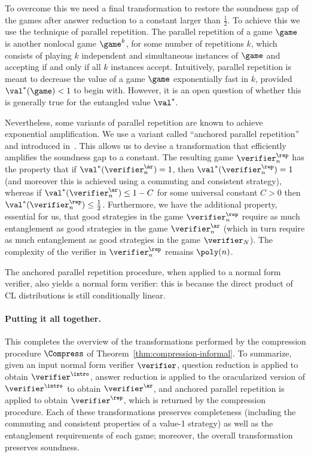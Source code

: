 To overcome this we need a final transformation to restore the soundness gap of the games after answer reduction to a constant larger than $\frac{1}{2}$. To achieve this we use the technique of {parallel repetition}. The parallel repetition of a game $\game$ is another nonlocal game $\game^k$, for some number of repetitions $k$, which consists of playing $k$ independent and simultaneous instances of $\game$ and accepting if and only if all $k$ instances accept. Intuitively, parallel repetition is meant to decrease the value of a game $\game$ exponentially fast in $k$, provided $\val^*(\game) < 1$ to begin with. However, it is an open question of whether this is generally true for the entangled value $\val^*$. 

Nevertheless, some variants of parallel repetition are known to achieve exponential amplification. We use  a variant  called ``anchored parallel repetition'' and introduced in~\cite{bavarian2017hardness}. This allows us to devise a transformation that efficiently amplifies the soundness gap to a constant. The resulting game $\verifier^\rep_n$ has the property that if $\val^*(\verifier^\ar_n) = 1$, then $\val^*(\verifier^\rep_n) = 1$ (and moreover this is achieved using a commuting and consistent strategy), whereas if $\val^*(\verifier^\ar_n) \leq 1 - C$ for some universal constant $C > 0$ then $\val^*(\verifier^\rep_n) \leq \frac{1}{2}$. Furthermore, we have the additional property, essential for us, that good strategies in the game $\verifier^\rep_n$ require as much entanglement as good strategies in the game $\verifier^\ar_n$ (which in turn require as much entanglement as good strategies in the game $\verifier_N$). The complexity of the verifier in $\verifier^\rep_n$ remains $\poly(n)$.

The anchored parallel repetition procedure, when applied to a normal form verifier, also yields a normal form verifier: this is because the direct product of CL distributions is still conditionally linear. 


\paragraph{Putting it all together.} This completes the overview of the transformations performed by the compression procedure $\Compress$ of Theorem~\ref{thm:compression-informal}. To summarize, given an input normal form verifier $\verifier$, question reduction is applied to obtain $\verifier^\intro$, answer reduction is applied to the oracularized version of $\verifier^\intro$ to obtain $\verifier^\ar$, and  anchored parallel repetition is applied to obtain $\verifier^\rep$, which is returned by the compression procedure. Each of these transformations preserves completeness (including the commuting and consistent properties of a value-1 strategy) as well as the entanglement requirements of each game; moreover, the overall transformation preserves soundness. 
 
